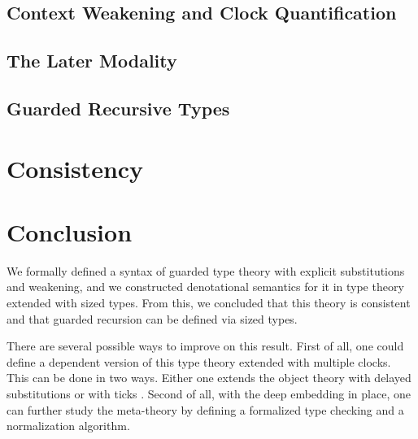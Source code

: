 \documentclass[a4paper,UKenglish,cleveref, autoref,numberwithinsect]{lipics-v2019}
\begin{document}
\subsection{Context Weakening and Clock Quantification}



\subsection{The Later Modality}
\label{sec:later}




\subsection{Guarded Recursive Types}


\section{Consistency}


\section{Conclusion}
We formally defined a syntax of guarded type theory with explicit substitutions and weakening, and we constructed denotational semantics for it in type theory extended with sized types.
From this, we concluded that this theory is consistent and that guarded recursion can be defined via sized types.

There are several possible ways to improve on this result.
First of all, one could define a dependent version of this type theory extended with multiple clocks.
This can be done in two ways.
Either one extends the object theory with delayed substitutions \cite{bizjak2016guarded} or with ticks \cite{BahrGM17}.
Second of all, with the deep embedding in place, one can further study the meta-theory by defining a formalized type checking and a normalization algorithm.




\end{document}
